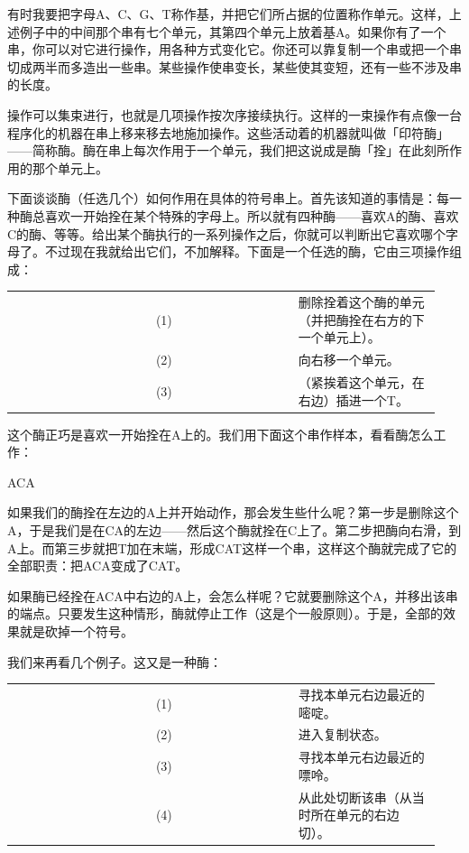 \documentclass[
  12pt,
  twoside,
  openright,
  oldfontcommands,
]{memoir}
\begin{document}
有时我要把字母A、C、G、T称作基，并把它们所占据的位置称作单元。这样，上述例子中的中间那个串有七个单元，其第四个单元上放着基A。如果你有了一个串，你可以对它进行操作，用各种方式变化它。你还可以靠复制一个串或把一个串切成两半而多造出一些串。某些操作使串变长，某些使其变短，还有一些不涉及串的长度。

操作可以集束进行，也就是几项操作按次序接续执行。这样的一束操作有点像一台程序化的机器在串上移来移去地施加操作。这些活动着的机器就叫做「印符酶」------简称酶。酶在串上每次作用于一个单元，我们把这说成是酶「拴」在此刻所作用的那个单元上。

下面谈谈酶（任选几个）如何作用在具体的符号串上。首先该知道的事情是：每一种酶总喜欢一开始拴在某个特殊的字母上。所以就有四种酶------喜欢A的酶、喜欢C的酶、等等。给出某个酶执行的一系列操作之后，你就可以判断出它喜欢哪个字母了。不过现在我就给出它们，不加解释。下面是一个任选的酶，它由三项操作组成：

\begin{longtable}[]{>{\raggedright\arraybackslash}p{0.313\linewidth} >{\raggedright\arraybackslash}p{0.313\linewidth} >{\raggedright\arraybackslash}p{0.313\linewidth}}
\toprule\noalign{}
\endhead
\bottomrule\noalign{}
\endlastfoot
\multirow{3}{=}{$\left\{\rule[-1.5\normalbaselineskip]{0pt}{3\normalbaselineskip}\right.$}
& (1) & 删除拴着这个酶的单元（并把酶拴在右方的下一个单元上）。 \\
& (2) & 向右移一个单元。 \\
& (3) & （紧挨着这个单元，在右边）插进一个T。 \\
\end{longtable}

这个酶正巧是喜欢一开始拴在A上的。我们用下面这个串作样本，看看酶怎么工作：

ACA

如果我们的酶拴在左边的A上并开始动作，那会发生些什么呢？第一步是删除这个A，于是我们是在CA的左边------然后这个酶就拴在C上了。第二步把酶向右滑，到A上。而第三步就把T加在末端，形成CAT这样一个串，这样这个酶就完成了它的全部职责：把ACA变成了CAT。

如果酶已经拴在ACA中右边的A上，会怎么样呢？它就要删除这个A，并移出该串的端点。只要发生这种情形，酶就停止工作（这是个一般原则）。于是，全部的效果就是砍掉一个符号。

我们来再看几个例子。这又是一种酶：

\begin{longtable}[]{>{\raggedright\arraybackslash}p{0.313\linewidth} >{\raggedright\arraybackslash}p{0.313\linewidth} >{\raggedright\arraybackslash}p{0.313\linewidth}}
\toprule\noalign{}
\endhead
\bottomrule\noalign{}
\endlastfoot
\multirow{4}{=}{$\left\{\rule[-2\normalbaselineskip]{0pt}{4\normalbaselineskip}\right.$}
& (1) & 寻找本单元右边最近的嘧啶。 \\
& (2) & 进入复制状态。 \\
& (3) & 寻找本单元右边最近的嘌呤。 \\
& (4) & 从此处切断该串（从当时所在单元的右边切）。 \\
\end{longtable}
\end{document}
